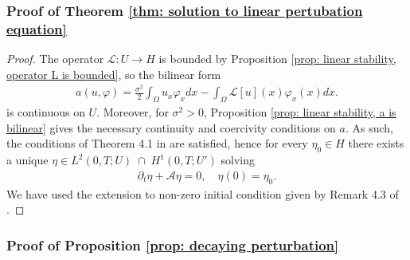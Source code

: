 \documentclass[10pt]{article}
\begin{document}
\subsubsection*{Proof of Theorem \ref{thm: solution to linear pertubation equation}}

\begin{proof}
    The operator $\mathcal{L}: U \rightarrow H$ is bounded by Proposition \ref{prop: linear stability, operator L is bounded}, so the bilinear form 
    \begin{align*}
    a(u,\varphi) = \frac{\sigma^2}{2}\int_\Omega u_x \varphi_x dx - \int_\Omega \mathcal{L}[u](x) \varphi_x(x) dx.
    \end{align*}
    is continuous on $U$. Moreover, for $\sigma^2 >0$, Proposition \ref{prop: linear stability, a is bilinear} gives 
    the necessary continuity and coercivity conditions on $a$. As such, the conditions of Theorem 4.1 in \cite{LionsMagenes1972} are satisfied, hence for every $\eta_0 \in H$ there exists a unique $\eta \in L^2(0,T;U)\; \cap\; H^1(0,T;U')$ solving
    \begin{align*}
        \partial_t\eta + \mathcal{A}\eta = 0,\quad \eta(0) = \eta_0.
    \end{align*}
    We have used the extension to non-zero initial condition given by Remark 4.3 of \cite{LionsMagenes1972}.
\end{proof}


\subsubsection*{Proof of Proposition \ref{prop: decaying perturbation}}
\end{document}
